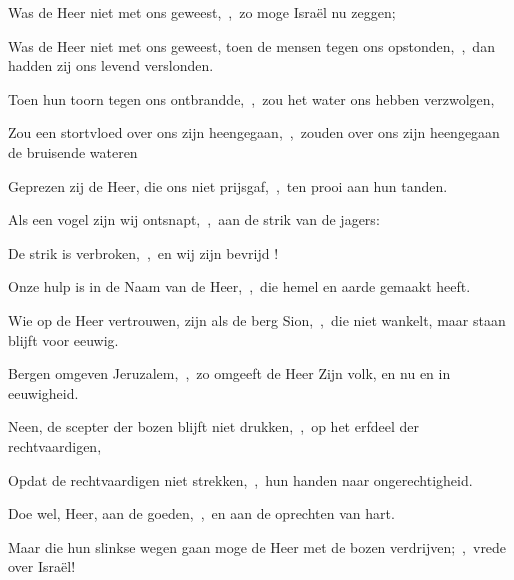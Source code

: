\documentclass[12pt,twoside,a5paper]{article}
\begin{document}
\begin{halfparskip}
  Was de Heer niet met ons geweest,~\sep\ zo moge Israël nu zeggen;


  Was de Heer niet met ons geweest, toen de mensen tegen ons opstonden,~\sep\ dan hadden zij ons levend verslonden.

  Toen hun toorn tegen ons ontbrandde,~\sep\ zou het water ons hebben verzwolgen,

  Zou een stortvloed over ons zijn heengegaan,~\sep\ zouden over ons zijn heengegaan de bruisende wateren

  Geprezen zij de Heer, die ons niet prijsgaf,~\sep\ ten prooi aan hun tanden.

  Als een vogel zijn wij ontsnapt,~\sep\ aan de strik van de jagers:

  De strik is verbroken,~\sep\ en wij zijn bevrijd !

  Onze hulp is in de Naam van de Heer,~\sep\ die hemel en aarde gemaakt heeft.
\end{halfparskip}


\begin{halfparskip}
  Wie op de Heer vertrouwen, zijn als de berg Sion,~\sep\ die niet wankelt, maar staan blijft voor eeuwig.


  Bergen omgeven Jeruzalem,~\sep\ zo omgeeft de Heer Zijn volk, en nu en in eeuwigheid.

  Neen, de scepter der bozen blijft niet drukken,~\sep\ op het erfdeel der rechtvaardigen,

  Opdat de rechtvaardigen niet strekken,~\sep\ hun handen naar ongerechtigheid.

  Doe wel, Heer, aan de goeden,~\sep\ en aan de oprechten van hart.

  Maar die hun slinkse wegen gaan moge de Heer met de bozen verdrijven;~\sep\ vrede over Israël!
\end{halfparskip}

\end{document}
